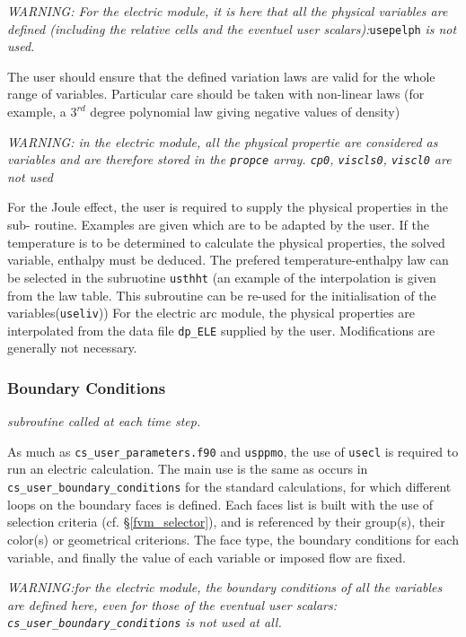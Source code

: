 {{{{\em WARNING: For the electric module, it is here that all the physical variables are defined
 (including the relative cells and the eventuel user scalars):}\texttt{usepelph} {\em {is not used.}}

The user should ensure that the defined variation laws are valid for the whole range of
variables. Particular care should be taken with non-linear laws (for example, a
 $3^{rd}$ degree polynomial law giving negative values of density)

{\em WARNING: in the electric module, all the physical propertie are considered as variables
 and are therefore stored in the \texttt{propce} array. \texttt{cp0}, \texttt{viscls0}, \texttt{viscl0}
 are not used}

For the Joule effect, the user is required to supply the physical properties in the sub-
routine. Examples are given which are to be adapted by the user. If the temperature is
to be determined to calculate the physical properties, the solved variable, enthalpy must
 be deduced. The prefered temperature-enthalpy law can be selected in the subruotine
 \texttt{usthht} (an example of the interpolation is given from the law table. This
subroutine can be re-used for the initialisation of the variables(\texttt{useliv}))
 For the electric arc module, the physical properties are interpolated from the data file
 \texttt{dp\_ELE} supplied by the user. Modifications are generally not necessary.

\subsubsection{Boundary Conditions}

\noindent
\textit {subroutine called at each time step.}

As much as \texttt{cs\_user\_parameters.f90} and \texttt{usppmo}, the use of \texttt{usecl}
is required to run an electric calculation. The main use is the same as
occurs in \texttt{cs\_user\_boundary\_conditions} for the standard \CS calculations, for which 
different loops on the boundary faces is defined. Each faces list is
built with the use of selection criteria (cf. \S\ref{fvm_selector}),
and is referenced by their group(s), their color(s) or geometrical
criterions. The face type, the boundary conditions for each variable,
and finally the value of each variable or imposed flow are fixed.

{\em WARNING:for the electric module, the boundary conditions of all
 the variables are defined here,
even for those of the eventual user scalars: {\em \texttt{cs\_user\_boundary\_conditions}} is not
used at all.}

}}}
